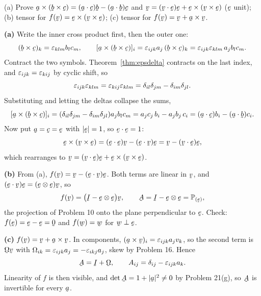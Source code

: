 \begin{problem}
(a) Prove $\ba\times(\bb\times\bc)=(\ip\ba\bc)\bb-(\ip\ba\bb)\bc$ and
$\bv=(\ip\bv\be)\be+\be\times(\bv\times\be)$ ($\be$ unit); (b) tensor for
$f(\bv)=\be\times(\bv\times\be)$; (c) tensor for $f(\bv)=\bv+\ba\times\bv$.
\end{problem}
\begin{solution}
\textbf{(a)} Write the inner cross product first, then the outer one:
\[
   (\bb\times\bc)_k=\eps_{klm}b_lc_m,
   \qquad
   [\ba\times(\bb\times\bc)]_i=\eps_{ijk}a_j\,(\bb\times\bc)_k
   =\eps_{ijk}\eps_{klm}\,a_jb_lc_m .
\]
Contract the two symbols. Theorem~\ref{thm:epsdelta} contracts on the last
index, and $\varepsilon_{ijk}=\varepsilon_{kij}$ by cyclic shift, so
\[
   \varepsilon_{ijk}\varepsilon_{klm}=\varepsilon_{kij}\varepsilon_{klm}
   =\delta_{il}\delta_{jm}-\delta_{im}\delta_{jl}.
\]
Substituting and letting the deltas collapse the sums,
\[
   [\ba\times(\bb\times\bc)]_i
   =(\dd_{il}\dd_{jm}-\dd_{im}\dd_{jl})a_jb_lc_m
   =a_jc_j\,b_i-a_jb_j\,c_i
   =(\ip\ba\bc)b_i-(\ip\ba\bb)c_i .
\]
Now put $\ba=\bc=\be$ with $|\be|=1$, so $\ip\be\be=1$:
\[
   \be\times(\bv\times\be)=(\ip\be\be)\bv-(\ip\be\bv)\be
   =\bv-(\ip\bv\be)\be ,
\]
which rearranges to $\bv=(\ip\bv\be)\be+\be\times(\bv\times\be)$.

\textbf{(b)} From (a), $f(\bv)=\bv-(\ip\be\bv)\be$. Both terms are linear
in $\bv$, and $(\ip\be\bv)\be=(\be\otimes\be)\bv$, so
\[
   f(\bv)=\big(\I-\be\otimes\be\big)\bv,
   \qquad \bA=\I-\be\otimes\be=\Proj\be ,
\]
the projection of Problem 10 onto the plane perpendicular to $\be$. Check:
$f(\be)=\be-\be=\bze$ and $f(\bw)=\bw$ for $\bw\perp\be$.

\textbf{(c)} $f(\bv)=\bv+\ba\times\bv$. In components,
$(\ba\times\bv)_i=\eps_{ijk}a_jv_k$, so the second term is
$\bOm\bv$ with $\Omega_{ik}=\varepsilon_{ijk}a_j=-\varepsilon_{ikj}a_j$, skew by
Problem 16. Hence
\[
   \bA=\I+\bOm,\qquad A_{ij}=\dd_{ij}-\eps_{ijk}a_k .
\]
Linearity of $f$ is then visible, and $\det\bA=1+|\ba|^{2}\neq0$ by
Problem 21(g), so $\bA$ is invertible for every $\ba$.
\end{solution}

